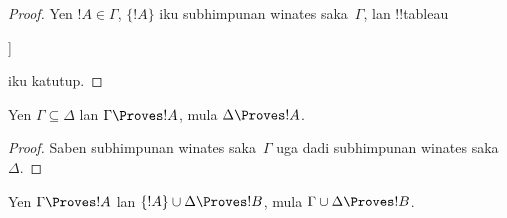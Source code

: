 \documentclass[../../../include/open-logic-section]{subfiles}
\begin{document}
\begin{proof}
Yen $!A \in \Gamma$, $\{!A\}$ iku subhimpunan winates saka~$\Gamma$,
lan !!{tableau}
\begin{oltableau}
  [\sFmla{\False}{\formula{A}}, just = \TAss
    [\sFmla{\True}{\formula{A}}, just = \TAss,close]
  ]
\end{oltableau}
iku katutup.
\end{proof}
  

\begin{prop}[Monotonisitas]
Yen $\Gamma \subseteq \Delta$ lan $\Gamma \Proves !A$, mula $\Delta
\Proves !A$.
\end{prop}

\begin{proof}
Saben subhimpunan winates saka~$\Gamma$ uga dadi subhimpunan winates
saka~$\Delta$.
\end{proof}

\begin{prop}[Transitivitas]
Yen $\Gamma \Proves !A$ lan $\{!A\} \cup
\Delta \Proves !B$, mula $\Gamma \cup \Delta \Proves !B$.
\end{prop}
\end{document}

